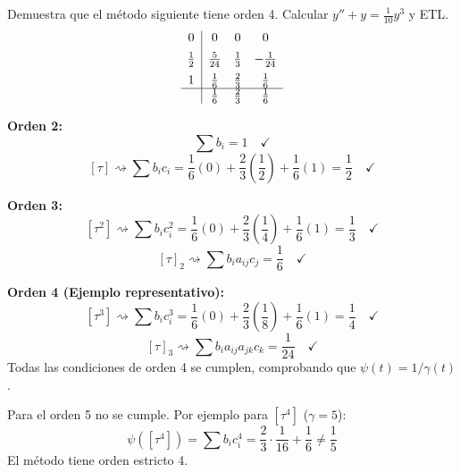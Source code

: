 \begin{ejer}[5.7.2]
Demuestra que el m\'etodo siguiente tiene orden 4. Calcular $y'' + y = \frac{1}{10} y^3$ y ETL. 
\[
\begin{array}{c|ccc}
0           & 0             & 0             & 0             \\[0.5em]
\frac{1}{2} & \frac{5}{24}  & \frac{1}{3}   & -\frac{1}{24} \\[0.5em]
1           & \frac{1}{6}   & \frac{2}{3}   & \frac{1}{6}   \\
\hline
            & \frac{1}{6}   & \frac{2}{3}   & \frac{1}{6}
\end{array}
\]
\end{ejer}
\begin{sol}
\textbf{Orden 2:}
$$ \sum b_i = 1 \quad \checkmark $$
$$ [\tau] \rightsquigarrow \sum b_i c_i = \frac{1}{6}(0) + \frac{2}{3}\left(\frac{1}{2}\right) + \frac{1}{6}(1) = \frac{1}{2} \quad \checkmark $$

\textbf{Orden 3:}
$$ [\tau^2] \rightsquigarrow \sum b_i c_i^2 = \frac{1}{6}(0) + \frac{2}{3}\left(\frac{1}{4}\right) + \frac{1}{6}(1) = \frac{1}{3} \quad \checkmark $$
$$ [\tau]_2 \rightsquigarrow \sum b_i a_{ij} c_j = \frac{1}{6} \quad \checkmark $$

\textbf{Orden 4 (Ejemplo representativo):}
$$ [\tau^3] \rightsquigarrow \sum b_i c_i^3 = \frac{1}{6}(0) + \frac{2}{3}\left(\frac{1}{8}\right) + \frac{1}{6}(1) = \frac{1}{4} \quad \checkmark $$
$$ [\tau]_3 \rightsquigarrow \sum b_i a_{ij} a_{jk} c_k = \frac{1}{24} \quad \checkmark $$
Todas las condiciones de orden 4 se cumplen, comprobando que $\psi(t) = 1/\gamma(t)$. 

Para el orden 5 no se cumple. Por ejemplo para $[\tau^4]$ ($\gamma=5$):
$$ \psi([\tau^4]) = \sum b_i c_i^4 = \frac{2}{3}\cdot \frac{1}{16} + \frac{1}{6} \neq \frac{1}{5} $$
El método tiene orden estricto 4.
\end{sol}


